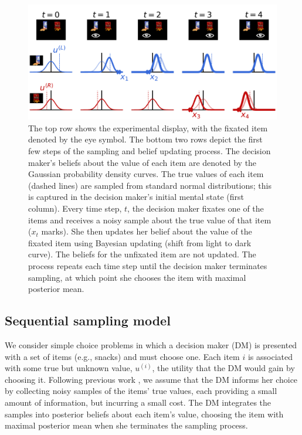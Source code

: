 \begin{figure}[t!]
    \centering
    \includegraphics[width=\textwidth]{figs/attention/Fig1.pdf}
    \caption{ The top row shows the experimental display, with the fixated item denoted by the eye symbol.  The bottom two rows depict the first few steps of the sampling and belief updating process. The decision maker's beliefs about the value of each item are denoted by the Gaussian probability density curves. The true values of each item (dashed lines) are sampled from standard normal distributions; this is captured in the decision maker's initial mental state (first column). Every time step, $t$, the decision maker fixates one of the items and receives a noisy sample about the true value of that item ($x_t$ marks). She then updates her belief about the value of the fixated item using Bayesian updating (shift from light to dark curve). The beliefs for the unfixated item are not updated. The process repeats each time step until the decision maker terminates sampling, at which point she chooses the item with maximal posterior mean.
  }
  \label{fig:attention1}
\end{figure}

 
\subsection{Sequential sampling model}

We consider simple choice problems in which a decision maker (DM) is presented with a set of items (e.g., snacks) and must choose one. Each item $i$ is associated with some true but unknown value, $u^{(i)}$, the utility that the DM would gain by choosing it. Following previous work \citep{ratcliff2008diffusion,krajbich2010visual,tajima2016optimal,tajima2019optimal,fudenberg2018speed,bogacz2006physics,drugowitsch2012cost,bitzer2014perceptual,gold2002banburismus}, we assume that the DM informs her choice by collecting noisy samples of the items' true values, each providing a small amount of information, but incurring a small cost. The DM integrates the samples into posterior beliefs about each item's value, choosing the item with maximal posterior mean when she terminates the sampling process.

